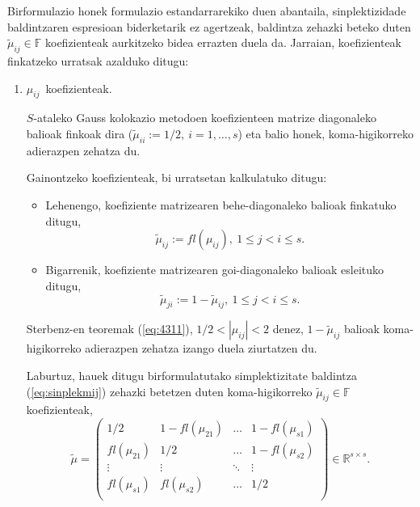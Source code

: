 Birformulazio honek formulazio estandarrarekiko duen abantaila,  sinplektizidade baldintzaren espresioan biderketarik ez agertzeak, baldintza zehazki beteko duten $\tilde \mu_{ij} \in \mathbb{F}$ koefizienteak aurkitzeko bidea errazten duela da. Jarraian, koefizienteak finkatzeko urratsak azalduko ditugu:
\begin{enumerate}
\item $\mu_{ij}$~koefizienteak.

$S$-ataleko Gauss kolokazio metodoen koefizienteen matrize diagonaleko balioak finkoak dira ($\tilde{\mu}_{ii}:=1/2, \ i=1,\dots,s$) eta balio honek, koma-higikorreko adierazpen zehatza du.

Gainontzeko koefizienteak, bi urratsetan kalkulatuko ditugu:
\begin{itemize}
\item Lehenengo, koefiziente matrizearen behe-diagonaleko balioak finkatuko ditugu,
\begin{equation*}
 \tilde{\mu}_{ij}:=fl(\mu_{ij}), \ 1 \leqslant j < i \leqslant s.
\end{equation*}

\item Bigarrenik, koefiziente matrizearen goi-diagonaleko balioak esleituko ditugu,
\begin{equation*}
\tilde{\mu}_{ji}:=1-\tilde{\mu}_{ij} , \ 1 \leqslant j < i \leqslant s.
\end{equation*}

\end{itemize}
Sterbenz-en teoremak (\ref{eq:4311}), $1/2 < |\mu_{ij}| <2$ denez, $1-\tilde{\mu}_{ij}$ balioak koma-higikorreko adierazpen zehatza izango duela ziurtatzen du. 

Laburtuz, hauek ditugu birformulatutako simplektizitate baldintza (\ref{eq:sinplekmij}) zehazki betetzen duten koma-higikorreko $\tilde{\mu}_{ij}\in \mathbb{F}$ koefizienteak,   
\begin{equation}
\tilde{\mu}=\left(\begin{array}{cccc}
    1/2       & 1-fl(\mu_{21}) & \dots & 1-fl(\mu_{s1})      \\
    fl(\mu_{21})      & 1/2    & \dots & 1-fl(\mu_{s2})      \\
    \vdots            & \vdots         & \ddots      & \vdots      \\
    fl(\mu_{s1})      & fl(\mu_{s2})   & \dots & 1/2          \\ 
     \end{array}\right) \in \mathbb{R}^{s \times s}.
\end{equation}


\end{enumerate}
